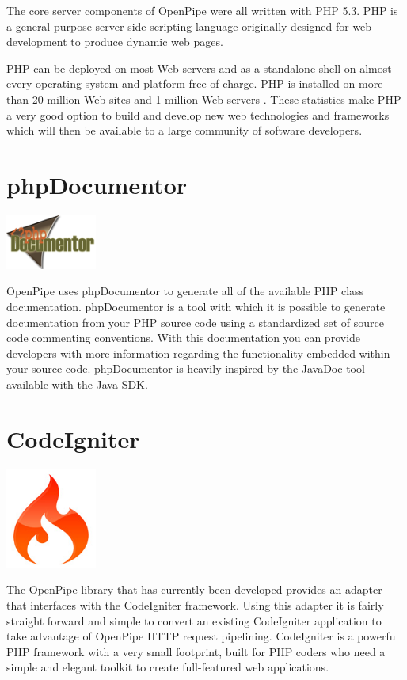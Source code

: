 \documentclass[12pt]{report}
\begin{document}
The core server components of OpenPipe were all written with PHP 5.3. PHP is a general-purpose server-side scripting language originally designed for web development to produce dynamic web pages.

PHP can be deployed on most Web servers and as a standalone shell on almost every operating system and platform free of charge.  PHP is installed on more than 20 million Web sites and 1 million Web servers \cite{phpWiki}. These statistics make PHP a very good option to build and develop new web technologies and frameworks which will then be available to a large community of software developers.


\section{phpDocumentor}
\begin{center} 
\includegraphics[width=30mm]{figures/images/php_documentor_logo.png}
\end{center}

OpenPipe uses phpDocumentor to generate all of the available PHP class documentation. phpDocumentor is a tool with which it is possible to generate documentation from your PHP source code using a standardized set of source code commenting conventions. With this documentation you can provide developers with more information regarding the functionality embedded within your source code. phpDocumentor is heavily inspired by the JavaDoc tool available with the Java SDK. 


\section{CodeIgniter}
\begin{center}
\includegraphics[width=30mm]{figures/images/ci_logo.jpg}
\end{center}

The OpenPipe library that has currently been developed provides an adapter that interfaces with the CodeIgniter framework. Using this adapter it is fairly straight forward and simple to convert an existing CodeIgniter application to take advantage of OpenPipe HTTP request pipelining. CodeIgniter is a powerful PHP framework with a very small footprint, built for PHP coders who need a simple and elegant toolkit to create full-featured web applications. 
\end{document}
